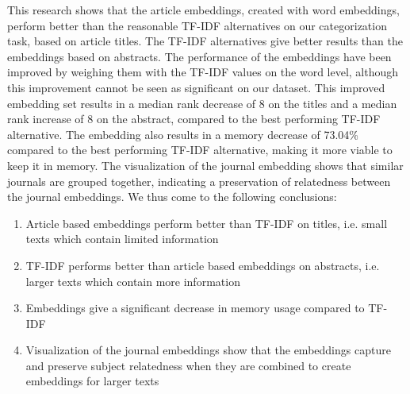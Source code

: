 \documentclass[../../Thesis.tex]{subfiles}
\begin{document}
This research shows that the article embeddings, created with word embeddings, perform better than the reasonable TF-IDF alternatives on our categorization task, based on article titles. The TF-IDF alternatives give better results than the embeddings based on abstracts. The performance of the embeddings have been improved by weighing them with the TF-IDF values on the word level, although this improvement cannot be seen as significant on our dataset. This improved embedding set results in a median rank decrease of 8 on the titles and a median rank increase of 8 on the abstract, compared to the best performing TF-IDF alternative.  The embedding also results in a memory decrease of 73.04\% compared to the best performing TF-IDF alternative, making it more viable to keep it in memory. The visualization of the journal embedding shows that similar journals are grouped together, indicating a preservation of relatedness between the journal embeddings. We thus come to the following conclusions:
\begin{enumerate}
\item{Article based embeddings perform better than TF-IDF on titles, i.e. small texts which contain limited information}
\item{TF-IDF performs better than article based embeddings on abstracts, i.e. larger texts which contain more information}
\item{Embeddings give a significant decrease in memory usage compared to TF-IDF}
\item{Visualization of the journal embeddings show that the embeddings capture and preserve subject relatedness when they are combined to create embeddings for larger texts}

\end{enumerate}
\end{document}

